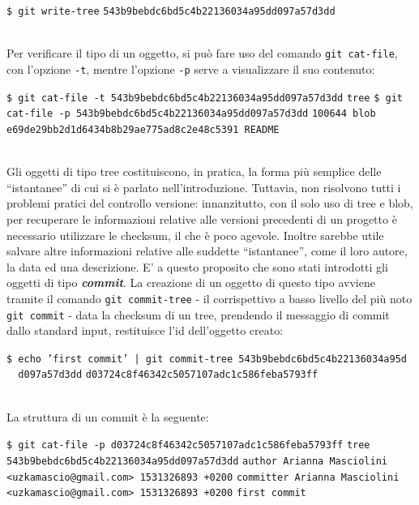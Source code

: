 \documentclass[12pt]{article}
\def\code#1{\texttt{#1}}
\def\quote#1{``#1''}
\begin{document}
\begin{algorithm*}
	\begin{algorithmic}
		\State \code{\$ git write-tree}
		\State \code{543b9bebdc6bd5c4b22136034a95dd097a57d3dd}	
	\end{algorithmic}
\end{algorithm*}
\ \\Per verificare il tipo di un oggetto, si può fare uso del comando \code{git cat-file}, con l'opzione \code{-t}, mentre l'opzione \code{-p} serve a visualizzare il suo contenuto:
\begin{algorithm*}
	\begin{algorithmic}
		\State \code{\$ git cat-file -t 543b9bebdc6bd5c4b22136034a95dd097a57d3dd}
		\State \code{tree}
		\State \code{\$ git cat-file -p 543b9bebdc6bd5c4b22136034a95dd097a57d3dd}
		\State \code{100644 blob e69de29bb2d1d6434b8b29ae775ad8c2e48c5391 README}
	\end{algorithmic}
\end{algorithm*}
\ \\ 
Gli oggetti di tipo tree costituiscono, in pratica, la forma più semplice delle \quote{istantanee} di cui si è parlato nell'introduzione. Tuttavia, non risolvono tutti i problemi pratici del controllo versione: innanzitutto, con il solo uso di tree e blob, per recuperare le informazioni relative alle versioni precedenti di un progetto è necessario utilizzare le checksum, il che è poco agevole. Inoltre sarebbe utile salvare altre informazioni relative alle suddette \quote{istantanee}, come il loro autore, la data ed una descrizione. E' a questo proposito che sono stati introdotti gli oggetti di tipo \textit{\textbf{commit}}.
La creazione di un oggetto di questo tipo avviene tramite il comando \code{git commit-tree} - il corrispettivo a basso livello del più noto \code{git commit} - data la checksum di un tree, prendendo il messaggio di commit dallo standard input, restituisce l'id dell'oggetto creato:
\begin{algorithm*}
	\begin{algorithmic}
		\State \code{\$ echo 'first commit' | git commit-tree 543b9bebdc6bd5c4b22136034a95d\\ \ \ d097a57d3dd}
		\State \code{d03724c8f46342c5057107adc1c586feba5793ff}
	\end{algorithmic}
\end{algorithm*}
\ \\ 
La struttura di un commit è la seguente:
\begin{algorithm*}
	\begin{algorithmic}
		\State \code{\$ git cat-file -p d03724c8f46342c5057107adc1c586feba5793ff}
		\State \code{tree 543b9bebdc6bd5c4b22136034a95dd097a57d3dd}
		\State \code{author Arianna Masciolini <uzkamascio@gmail.com> 1531326893 +0200}
		\State \code{committer Arianna Masciolini <uzkamascio@gmail.com> 1531326893 +0200}
		\State 
		\State \code{first commit}
	\end{algorithmic}
\end{algorithm*}
\end{document}

